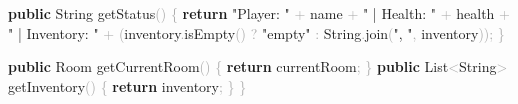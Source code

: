 \documentclass[
  justified,
  openright,
]{tufte-book}
\newcommand{\KeywordTok}[1]{\textcolor{CodeKeyword}{\textbf{#1}}}  %
\newcommand{\StringTok}[1]{\textcolor{CodeString}{#1}}              %
\newcommand{\CodeFuncTok}[1]{\textcolor{CodeKeyword}{#1}}           %
\newcommand{\OperatorTok}[1]{\textcolor{DarkGray}{#1}}              %
\newenvironment{Shaded}{%
  \begin{mdframed}[style=TufteCode]%
}{%
  \end{mdframed}%
}
\begin{document}
\begin{Shaded}
\begin{Highlighting}[]
    \KeywordTok{public} String \CodeFuncTok{getStatus}\OperatorTok{()} \OperatorTok{\{}
        \KeywordTok{return} \StringTok{"Player: "} \OperatorTok{+} name \OperatorTok{+} \StringTok{" | Health: "} \OperatorTok{+} health \OperatorTok{+}
               \StringTok{" | Inventory: "} \OperatorTok{+} \OperatorTok{(}inventory\OperatorTok{.}\CodeFuncTok{isEmpty}\OperatorTok{()} \OperatorTok{?} \StringTok{"empty"} \OperatorTok{:} String\OperatorTok{.}\CodeFuncTok{join}\OperatorTok{(}\StringTok{", "}\OperatorTok{,} inventory\OperatorTok{));}
    \OperatorTok{\}}
 
    \KeywordTok{public} Room \CodeFuncTok{getCurrentRoom}\OperatorTok{()} \OperatorTok{\{} \KeywordTok{return} currentRoom\OperatorTok{;} \OperatorTok{\}}
    \KeywordTok{public} List\OperatorTok{\textless{}}String\OperatorTok{\textgreater{}} \CodeFuncTok{getInventory}\OperatorTok{()} \OperatorTok{\{} \KeywordTok{return} inventory\OperatorTok{;} \OperatorTok{\}}
\OperatorTok{\}}
\end{Highlighting}
\end{Shaded}
\end{document}
